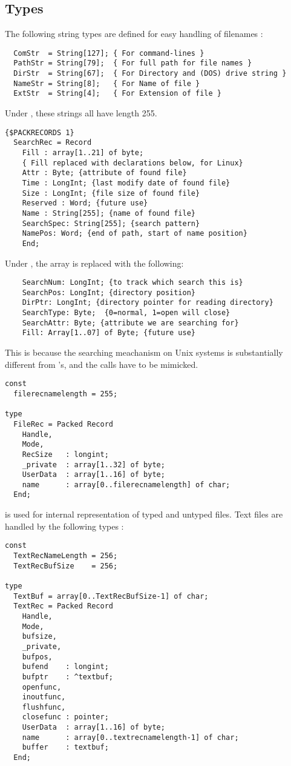 \subsection{Types}
The following string types are defined for easy handling of
filenames :
\begin{verbatim}
  ComStr  = String[127]; { For command-lines } 
  PathStr = String[79];  { For full path for file names }
  DirStr  = String[67];  { For Directory and (DOS) drive string }
  NameStr = String[8];   { For Name of file }
  ExtStr  = String[4];   { For Extension of file }
\end{verbatim}
Under \linux, these strings all have length 255.
\begin{verbatim}
{$PACKRECORDS 1}
  SearchRec = Record
    Fill : array[1..21] of byte;  
    { Fill replaced with declarations below, for Linux}
    Attr : Byte; {attribute of found file}
    Time : LongInt; {last modify date of found file}
    Size : LongInt; {file size of found file}
    Reserved : Word; {future use}
    Name : String[255]; {name of found file}
    SearchSpec: String[255]; {search pattern}
    NamePos: Word; {end of path, start of name position}
    End;
\end{verbatim}
Under \linux, the  array is replaced with the following:
\begin{verbatim}
    SearchNum: LongInt; {to track which search this is}
    SearchPos: LongInt; {directory position}
    DirPtr: LongInt; {directory pointer for reading directory}
    SearchType: Byte;  {0=normal, 1=open will close}
    SearchAttr: Byte; {attribute we are searching for}
    Fill: Array[1..07] of Byte; {future use}
\end{verbatim}
This is because the searching meachanism on Unix systems is substantially
different from \dos's, and the calls have to be mimicked.
\begin{verbatim}
const
  filerecnamelength = 255;

type
  FileRec = Packed Record
    Handle,
    Mode,  
    RecSize   : longint;
    _private  : array[1..32] of byte;
    UserData  : array[1..16] of byte;
    name      : array[0..filerecnamelength] of char;
  End;
\end{verbatim}
 is used for internal representation of typed and untyped files.
Text files are handled by the following types :
\begin{verbatim}
const
  TextRecNameLength = 256;
  TextRecBufSize    = 256;

type
  TextBuf = array[0..TextRecBufSize-1] of char;
  TextRec = Packed Record
    Handle,
    Mode,  
    bufsize,
    _private,
    bufpos,  
    bufend    : longint;
    bufptr    : ^textbuf;
    openfunc,
    inoutfunc,
    flushfunc,
    closefunc : pointer;
    UserData  : array[1..16] of byte;
    name      : array[0..textrecnamelength-1] of char;
    buffer    : textbuf;
  End;
\end{verbatim}
